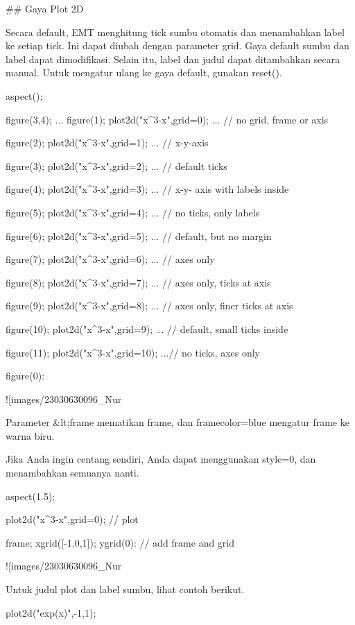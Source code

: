 \documentclass{article}
\begin{document}
## Gaya Plot 2D

Secara default, EMT menghitung tick sumbu otomatis dan menambahkan
label ke setiap tick. Ini dapat diubah dengan parameter grid. Gaya
default sumbu dan label dapat dimodifikasi. Selain itu, label dan
judul dapat ditambahkan secara manual. Untuk mengatur ulang ke gaya
default, gunakan reset().


\>aspect();

\>figure(3,4); ...  
\>    figure(1); plot2d("x^3-x",grid=0); ... // no grid, frame or axis

\> figure(2); plot2d("x^3-x",grid=1); ... // x-y-axis

\> figure(3); plot2d("x^3-x",grid=2); ... // default ticks

\> figure(4); plot2d("x^3-x",grid=3); ... // x-y- axis with labels inside

\> figure(5); plot2d("x^3-x",grid=4); ... // no ticks, only labels

\> figure(6); plot2d("x^3-x",grid=5); ... // default, but no margin

\> figure(7); plot2d("x^3-x",grid=6); ... // axes only

\> figure(8); plot2d("x^3-x",grid=7); ... // axes only, ticks at axis

\> figure(9); plot2d("x^3-x",grid=8); ... // axes only, finer ticks at axis

\> figure(10); plot2d("x^3-x",grid=9); ... // default, small ticks inside

\> figure(11); plot2d("x^3-x",grid=10); ...// no ticks, axes only

\> figure(0):


![images/23030630096_Nur%

Parameter &lt;frame mematikan frame, dan framecolor=blue mengatur frame
ke warna biru.


Jika Anda ingin centang sendiri, Anda dapat menggunakan style=0, dan
menambahkan semuanya nanti.


\>aspect(1.5); 

\>plot2d("x^3-x",grid=0); // plot

\>frame; xgrid([-1,0,1]); ygrid(0): // add frame and grid


![images/23030630096_Nur%

Untuk judul plot dan label sumbu, lihat contoh berikut.


\>plot2d("exp(x)",-1,1);
\end{document}
